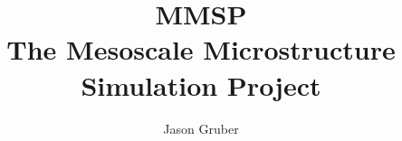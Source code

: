 \documentclass{book}
\title{MMSP\\{\large The Mesoscale Microstructure Simulation Project}}
\author{Jason Gruber}
\begin{document}
\maketitle
\tableofcontents
\def\MMSP{{\tt MMSP\ }}







\end{document}
